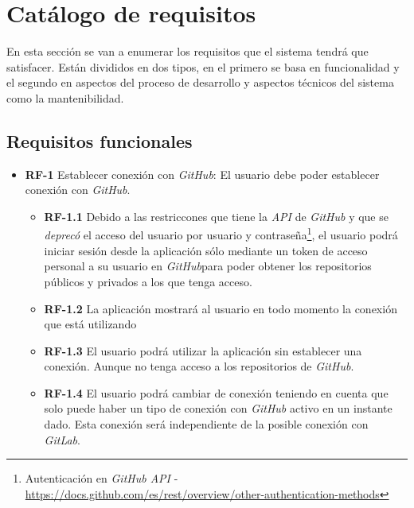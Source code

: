 \section{Catálogo de requisitos}
En esta sección se van a enumerar los requisitos que el sistema tendrá que satisfacer. Están divididos en dos tipos, en el primero se basa en funcionalidad y el segundo en aspectos del proceso de desarrollo y aspectos técnicos del sistema como la mantenibilidad.

\subsection{Requisitos funcionales}

\begin{itemize}
\item \textbf{RF-1} Establecer conexión con \textit{GitHub}: El usuario debe poder establecer conexión con \textit{GitHub}.
	\begin{itemize}
		\item \textbf{RF-1.1} Debido a las restriccones que tiene la \textit{API} de \textit{GitHub} y que se \textit{deprecó} el acceso del usuario por usuario y contraseña\footnote{Autenticación en \textit{GitHub API} - \url{https://docs.github.com/es/rest/overview/other-authentication-methods}}, el usuario podrá iniciar sesión desde la aplicación sólo mediante un token de acceso personal a su usuario en \textit{GitHub}para poder obtener los repositorios públicos y privados a los que tenga acceso.
		\item \textbf{RF-1.2} La aplicación mostrará al usuario en todo momento la conexión que está utilizando
		\item \textbf{RF-1.3} El usuario podrá utilizar la aplicación sin establecer una conexión. Aunque no tenga acceso a los repositorios de \textit{GitHub}.
		\item \textbf{RF-1.4} El usuario podrá cambiar de conexión teniendo en cuenta que solo puede haber un tipo de conexión con \textit{GitHub} activo en un instante dado. Esta conexión será independiente de la posible conexión con \textit{GitLab}.


\end{itemize}
\end{itemize}
